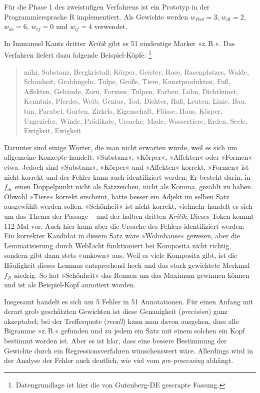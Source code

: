 \documentclass{article}
\newcommand*{\lit}{\textit}%
\newcommand*{\englisch}[1]{\foreignlanguage{english}{\textit{#1}}}%
\begin{document}
Für die Phase 1 des zweistufigen Verfahrens ist ein Prototyp in der
Programmiersprache R implementiert. Als Gewichte werden $w_{PoS}=3$,
$w_{dt}=2$, $w_{dc}=6$, $w_{tf}=0$ und $w_{lf}=4$ verwendet.

In Immanuel Kants dritter \lit{Kritik} gibt es 51 eindeutige Marker
»z.\,B.«. Das Verfahren liefert dazu folgende Beispiel-Köpfe:%
\footnote{Datengrundlage ist hier die von Gutenberg-DE gescrapte
  Fassung.} %
\begin{quote}
  mihi, Substanz, Bergkristall, Körper, Geister, Rose, Rasenplatzes,
  Walde, Schönheit, Grabhügeln, Tulpe, Größe, Tiere, Kunstprodukten,
  Fuß, Affekten, Gebäude, Zorn, Formen, Tulpen, Farben, Lohn,
  Dichtkunst, Kenntnis, Pferdes, Weib, Genius, Tod, Dichter, Haß,
  Leuten, Linie, Bau, tun, Parabel, Garten, Zirkels, Eigenschaft,
  Flüsse, Haus, Körper, Ungeziefer, Winde, Prädikate, Ursache, Made,
  Wassertiere, Erden, Seele, Ewigkeit, Ewigkeit
\end{quote}

Darunter sind einige Wörter, die man nicht erwarten würde, weil es
sich um allgemeine Konzepte handelt: »Substanz«, »Körper«, »Affekten«
oder »Formen« etwa. Jedoch sind »Substanz«, »Körper« und »Affekten«
korrekt. »Formen« ist nicht korrekt und der Fehler kann auch
identifiziert werden: Er besteht darin, in $f_{dc}$ einen Doppelpunkt
nicht als Satzzeichen, nicht als Komma, gezählt zu haben. Obwohl
»Tiere« korrekt erscheint, hätte besser ein Adjekt im selben Satz
ausgewählt werden sollen. »Schönheit« ist nicht korrekt, vielmehr
handelt es sich um das Thema der Passage -- und der halben dritten
\lit{Kritik}. Dieses Token kommt 112 Mal vor. Auch hier kann aber die
Ursache des Fehlers identifiziert werden: Ein korrekter Kandidat in
diesem Satz wäre »Wohnhause« gewesen, aber die Lemmatisierung durch
WebLicht funktioniert bei Komposita nicht richtig, sondern gibt dann
stets »unkown« aus. Weil es viele Komposita gibt, ist die Häufigkeit
dieses Lemmas entsprechend hoch und das stark gewichtete Merkmal
$f_{fl}$ niedrig. So hat »Schönheit« das Rennen um das Maximum
gewinnen können und ist als Beispiel-Kopf annotiert worden.

Insgesamt handelt es sich um 5 Fehler in 51 Annotationen. Für einen
Anfang mit derart grob geschätzten Gewichten ist diese Genauigkeit
(\englisch{precision}) ganz akzeptabel; bei der Trefferquote
(\englisch{recall}) kann man davon ausgehen, dass alle Bigramme
»z.\,B.« gefunden und zu jedem ein Satz mit einem solchen ein Kopf
bestimmt worden ist. Aber es ist klar, dass eine bessere Bestimmung
der Gewichte durch ein Regressionsverfahren wünschenswert
wäre. Allerdings wird in der Analyse der Fehler auch deutlich, wie
viel vom \englisch{pre-processing} abhängt.
\end{document}
